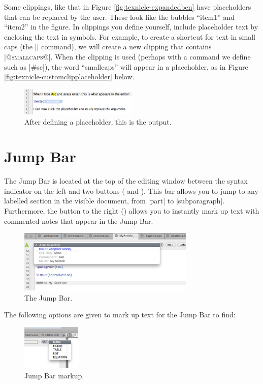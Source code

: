 Some clippings, like that in Figure \ref{fig:texnicle-expandedben} have placeholders that can be replaced by the user. These look like the bubbles ``item1'' and ``item2'' in the figure. In clippings you define yourself, include placeholder text by enclosing the text in \@ symbols. For example, to create a shortcut for text in small caps (the |\smallcaps| command), we will create a new clipping that contains |\textsc{@smallcaps@}|. When the clipping is used (perhaps with a command we define such as |#sc|), the word ``smallcaps'' will appear in a placeholder, as in Figure \ref{fig:texnicle-customclipplaceholder} below.
\begin{figure}[htbp]
\centering
\includegraphics[width=0.5\textwidth]{TeXnicle-Images/texnicle-customcliptag.png}
\caption{After defining a placeholder, this is the output.}
\label{fig:texnicle-customcliptag}
\end{figure}

\section{Jump Bar}
\label{reference.jumpbar}
The Jump Bar is located at the top of the editing window between the syntax indicator on the left and two buttons (\keys{\%\%\ensuremath{+}} and ). This bar allows you to jump to any labelled section in the visible document, from |part| to |subparagraph|. Furthermore, the button to the right (\keys{\%\%\ensuremath{+}}) allows you to instantly mark up text with commented notes that appear in the Jump Bar.
\begin{figure}[htbp]
\centering
\includegraphics[width=0.75\textwidth]{TeXnicle-Images/texnicle-jumpbar.png}
\caption{The Jump Bar.}
\label{fig:texnicle-jumpbar}
\end{figure}

The following options are given to mark up text for the Jump Bar to find:
\begin{figure}[htbp]
\centering
\includegraphics[width=0.25\textwidth]{TeXnicle-Images/texnicle-markup.png}
\caption{Jump Bar markup.}
\label{fig:texnicle-markup}
\end{figure}

